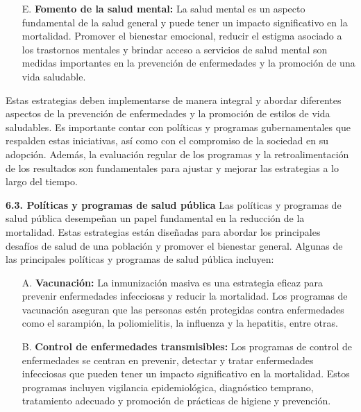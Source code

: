 \documentclass[8pt,a4paper]{beamer}
\begin{document}
{\begin{frame}{}
\begin{block}{}
\setlength{\parskip}{3px}
\justifying
\begin{enumerate}
\setlength{\parskip}{3px}
\justifying
\item[E.] \textbf{Fomento de la salud mental:} La salud mental es un aspecto fundamental de la salud general y puede tener un impacto significativo en la mortalidad. Promover el bienestar emocional, reducir el estigma asociado a los trastornos mentales y brindar acceso a servicios de salud mental son medidas importantes en la prevención de enfermedades y la promoción de una vida saludable.
\end{enumerate}
Estas estrategias deben implementarse de manera integral y abordar diferentes aspectos de la prevención de enfermedades y la promoción de estilos de vida saludables. Es importante contar con políticas y programas gubernamentales que respalden estas iniciativas, así como con el compromiso de la sociedad en su adopción. Además, la evaluación regular de los programas y la retroalimentación de los resultados son fundamentales para ajustar y mejorar las estrategias a lo largo del tiempo.
\end{block}
\end{frame}


\begin{frame}{}
\begin{block}{\textbf{6.3. Políticas y programas de salud pública}}
\setlength{\parskip}{3px}
\justifying
Las políticas y programas de salud pública desempeñan un papel fundamental en la reducción de la mortalidad. Estas estrategias están diseñadas para abordar los principales desafíos de salud de una población y promover el bienestar general. Algunas de las principales políticas y programas de salud pública incluyen:
\begin{enumerate}
\setlength{\parskip}{3px}
\justifying
\item[A.] \textbf{Vacunación:} La inmunización masiva es una estrategia eficaz para prevenir enfermedades infecciosas y reducir la mortalidad. Los programas de vacunación aseguran que las personas estén protegidas contra enfermedades como el sarampión, la poliomielitis, la influenza y la hepatitis, entre otras.

\item[B.] \textbf{Control de enfermedades transmisibles: }Los programas de control de enfermedades se centran en prevenir, detectar y tratar enfermedades infecciosas que pueden tener un impacto significativo en la mortalidad. Estos programas incluyen vigilancia epidemiológica, diagnóstico temprano, tratamiento adecuado y promoción de prácticas de higiene y prevención.
\end{enumerate}
\end{block}
\end{frame}


}
\end{document}

